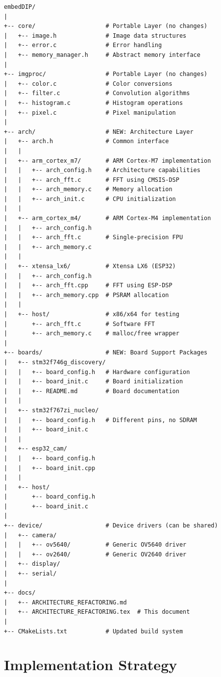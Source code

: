 \documentclass[11pt,a4paper]{article}
\begin{document}
\begin{lstlisting}[basicstyle=\ttfamily\small,frame=single]
embedDIP/
|
+-- core/                    # Portable Layer (no changes)
|   +-- image.h              # Image data structures
|   +-- error.c              # Error handling
|   +-- memory_manager.h     # Abstract memory interface
|
+-- imgproc/                 # Portable Layer (no changes)
|   +-- color.c              # Color conversions
|   +-- filter.c             # Convolution algorithms
|   +-- histogram.c          # Histogram operations
|   +-- pixel.c              # Pixel manipulation
|
+-- arch/                    # NEW: Architecture Layer
|   +-- arch.h               # Common interface
|   |
|   +-- arm_cortex_m7/       # ARM Cortex-M7 implementation
|   |   +-- arch_config.h    # Architecture capabilities
|   |   +-- arch_fft.c       # FFT using CMSIS-DSP
|   |   +-- arch_memory.c    # Memory allocation
|   |   +-- arch_init.c      # CPU initialization
|   |
|   +-- arm_cortex_m4/       # ARM Cortex-M4 implementation
|   |   +-- arch_config.h
|   |   +-- arch_fft.c       # Single-precision FPU
|   |   +-- arch_memory.c
|   |
|   +-- xtensa_lx6/          # Xtensa LX6 (ESP32)
|   |   +-- arch_config.h
|   |   +-- arch_fft.cpp     # FFT using ESP-DSP
|   |   +-- arch_memory.cpp  # PSRAM allocation
|   |
|   +-- host/                # x86/x64 for testing
|       +-- arch_fft.c       # Software FFT
|       +-- arch_memory.c    # malloc/free wrapper
|
+-- boards/                  # NEW: Board Support Packages
|   +-- stm32f746g_discovery/
|   |   +-- board_config.h   # Hardware configuration
|   |   +-- board_init.c     # Board initialization
|   |   +-- README.md        # Board documentation
|   |
|   +-- stm32f767zi_nucleo/
|   |   +-- board_config.h   # Different pins, no SDRAM
|   |   +-- board_init.c
|   |
|   +-- esp32_cam/
|   |   +-- board_config.h
|   |   +-- board_init.cpp
|   |
|   +-- host/
|       +-- board_config.h
|       +-- board_init.c
|
+-- device/                  # Device drivers (can be shared)
|   +-- camera/
|   |   +-- ov5640/          # Generic OV5640 driver
|   |   +-- ov2640/          # Generic OV2640 driver
|   +-- display/
|   +-- serial/
|
+-- docs/
|   +-- ARCHITECTURE_REFACTORING.md
|   +-- ARCHITECTURE_REFACTORING.tex  # This document
|
+-- CMakeLists.txt           # Updated build system
\end{lstlisting}

\section{Implementation Strategy}
\end{document}
